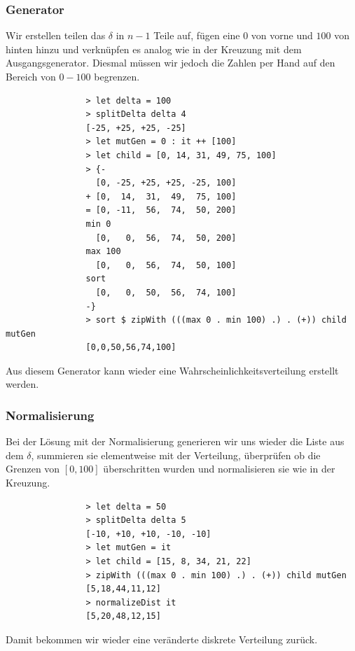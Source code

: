             \subsubsection*{Generator}

            Wir erstellen teilen das $\delta$ in $n-1$ Teile auf, fügen eine $0$ von vorne und $100$ von hinten hinzu und verknüpfen es analog wie in der Kreuzung mit dem Ausgangsgenerator. Diesmal müssen wir jedoch die Zahlen per Hand auf den Bereich von $0 - 100$ begrenzen.
            \begin{mdframed}
            \begin{verbatim}
                > let delta = 100
                > splitDelta delta 4
                [-25, +25, +25, -25]
                > let mutGen = 0 : it ++ [100]
                > let child = [0, 14, 31, 49, 75, 100]
                > {-
                  [0, -25, +25, +25, -25, 100]
                + [0,  14,  31,  49,  75, 100]
                = [0, -11,  56,  74,  50, 200]
                min 0
                  [0,   0,  56,  74,  50, 200]
                max 100
                  [0,   0,  56,  74,  50, 100]
                sort
                  [0,   0,  50,  56,  74, 100]
                -}
                > sort $ zipWith (((max 0 . min 100) .) . (+)) child mutGen
                [0,0,50,56,74,100]
            \end{verbatim}
            \end{mdframed}

            Aus diesem Generator kann wieder eine Wahrscheinlichkeitsverteilung erstellt werden.

            \subsubsection*{Normalisierung}

            Bei der Lösung mit der Normalisierung generieren wir uns wieder die Liste aus dem $\delta$, summieren sie elementweise mit der Verteilung, überprüfen ob die Grenzen von $[0,100]$ überschritten wurden und normalisieren sie wie in der Kreuzung.
            \begin{mdframed}
            \begin{verbatim}
                > let delta = 50
                > splitDelta delta 5
                [-10, +10, +10, -10, -10]
                > let mutGen = it
                > let child = [15, 8, 34, 21, 22]
                > zipWith (((max 0 . min 100) .) . (+)) child mutGen
                [5,18,44,11,12]
                > normalizeDist it
                [5,20,48,12,15]
            \end{verbatim}
            \end{mdframed}
            Damit bekommen wir wieder eine veränderte diskrete Verteilung zurück.
